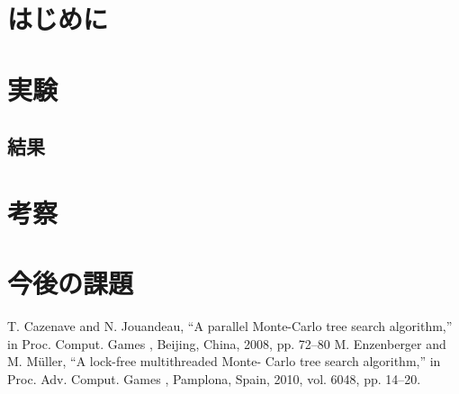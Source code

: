 \documentclass{zasshi-prml3}
\title{}  %
\date{2015年12月04日(金) 16時30分}      %
\author{}    %
\begin{document}

\section{はじめに}

\section{実験}

\subsection{結果}

\section{考察}

\section{今後の課題}

\begin{thebibliography}{9}
T. Cazenave and N. Jouandeau, “A
parallel Monte-Carlo tree search
algorithm,” in
Proc. Comput. Games
, Beijing, China, 2008, pp. 72–80
M. Enzenberger and M. Müller, “A
lock-free multithreaded Monte-
Carlo tree search algorithm,” in
Proc. Adv. Comput. Games
, Pamplona,
Spain, 2010, vol. 6048, pp. 14–20.
\end{thebibliography}
\end{document}
